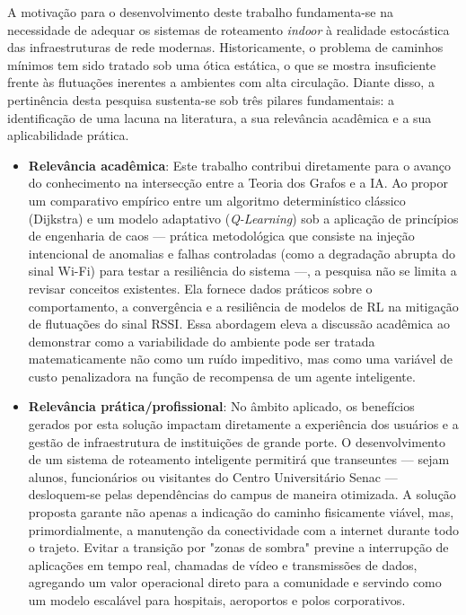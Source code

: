 \documentclass[
    12pt,                %
    openright,           %
    oneside,             %
    a4paper,             %
    english,             %
    brazil               %
]{abntex2}
\begin{document}
A motivação para o desenvolvimento deste trabalho fundamenta-se na necessidade de adequar os sistemas de roteamento \textit{indoor} à realidade estocástica das infraestruturas de rede modernas. Historicamente, o problema de caminhos mínimos tem sido tratado sob uma ótica estática, o que se mostra insuficiente frente às flutuações inerentes a ambientes com alta circulação. Diante disso, a pertinência desta pesquisa sustenta-se sob três pilares fundamentais: a identificação de uma lacuna na literatura, a sua relevância acadêmica e a sua aplicabilidade prática.
\begin{itemize}
    \item \textbf{Relevância acadêmica}: Este trabalho contribui diretamente para o avanço do conhecimento na intersecção entre a Teoria dos Grafos e a IA. Ao propor um comparativo empírico entre um algoritmo determinístico clássico (Dijkstra) e um modelo adaptativo (\textit{Q-Learning}) sob a aplicação de princípios de engenharia de caos --- prática metodológica que consiste na injeção intencional de anomalias e falhas controladas (como a degradação abrupta do sinal Wi-Fi) para testar a resiliência do sistema ---, a pesquisa não se limita a revisar conceitos existentes. Ela fornece dados práticos sobre o comportamento, a convergência e a resiliência de modelos de RL na mitigação de flutuações do sinal RSSI. Essa abordagem eleva a discussão acadêmica ao demonstrar como a variabilidade do ambiente pode ser tratada matematicamente não como um ruído impeditivo, mas como uma variável de custo penalizadora na função de recompensa de um agente inteligente.
    
    \item \textbf{Relevância prática/profissional}: No âmbito aplicado, os benefícios gerados por esta solução impactam diretamente a experiência dos usuários e a gestão de infraestrutura de instituições de grande porte. O desenvolvimento de um sistema de roteamento inteligente permitirá que transeuntes --- sejam alunos, funcionários ou visitantes do Centro Universitário Senac --- desloquem-se pelas dependências do campus de maneira otimizada. A solução proposta garante não apenas a indicação do caminho fisicamente viável, mas, primordialmente, a manutenção da conectividade com a internet durante todo o trajeto. Evitar a transição por "zonas de sombra" previne a interrupção de aplicações em tempo real, chamadas de vídeo e transmissões de dados, agregando um valor operacional direto para a comunidade e servindo como um modelo escalável para hospitais, aeroportos e polos corporativos.


\end{itemize}
\end{document}
